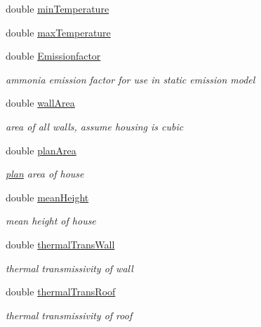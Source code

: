 \begin{DoxyCompactItemize}
\item 
double \hyperlink{classstable_ae3d42ac372bdf768d47ade3cf5ec3691}{minTemperature}
\item 
double \hyperlink{classstable_ad7c65b7d1858b8903bd997be80fa773a}{maxTemperature}
\item 
double \hyperlink{classstable_a81925f4e6ae3fff76da6011035ae6e93}{Emissionfactor}
\begin{DoxyCompactList}\small\item\em ammonia emission factor for use in static emission model \item\end{DoxyCompactList}\item 
double \hyperlink{classstable_ab03af3bbdccbf2ce7f505756133c39d6}{wallArea}
\begin{DoxyCompactList}\small\item\em area of all walls, assume housing is cubic \item\end{DoxyCompactList}\item 
double \hyperlink{classstable_afa55899e2704ab5fb1c444eff74be611}{planArea}
\begin{DoxyCompactList}\small\item\em \hyperlink{classplan}{plan} area of house \item\end{DoxyCompactList}\item 
double \hyperlink{classstable_a96fc0324c5e4a937b9e41b8545344491}{meanHeight}
\begin{DoxyCompactList}\small\item\em mean height of house \item\end{DoxyCompactList}\item 
double \hyperlink{classstable_afe7c8a3b3520bc4cdecaa787336c38d4}{thermalTransWall}
\begin{DoxyCompactList}\small\item\em thermal transmissivity of wall \item\end{DoxyCompactList}\item 
double \hyperlink{classstable_acdaf9b3f72667dc54be6b995cbf22e8d}{thermalTransRoof}
\begin{DoxyCompactList}\small\item\em thermal transmissivity of roof \item\end{DoxyCompactList}\item 

\end{DoxyCompactItemize}
